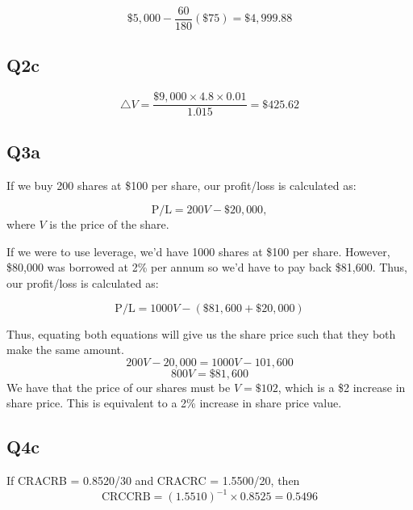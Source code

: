 \documentclass[a4paper]{article}[10pt]
\begin{document}
\begin{equation}
\$5,000 - \frac{60}{180}(\$75) = \$4,999.88	
\end{equation}

\subsection*{Q2c}
\begin{equation}
\triangle V = \frac{\$9,000 \times 4.8 \times 0.01}{1.015}	 = \$425.62
\end{equation}

\subsection*{Q3a}
If we buy 200 shares at \$100 per share, our profit/loss is calculated as:

\begin{equation}
\text{P/L} = 200V - \$20,000	,
\end{equation}
where $V$ is the price of the share.

If we were to use leverage, we'd have 1000 shares at \$100 per share. However, \$80,000 was borrowed at 2\% per annum so we'd have to pay back \$81,600.  Thus, our profit/loss is calculated as:

\begin{equation}
\text{P/L} = 1000V - (\$81,600 + \$20,000)	
\end{equation}

Thus, equating both equations will give us the share price such that they both make the same amount.
\begin{equation}
200V - 20,000 = 1000V - 101,600
\end{equation}
\begin{equation}
800V = \$81,600	
\end{equation}
We have that the price of our shares must be $V = \$102$, which is a \$2 increase in share price. This is equivalent to a 2\% increase in share price value.

\subsection*{Q4c}
If CRACRB = 0.8520/30 and CRACRC = 1.5500/20, then
\begin{equation}
\text{CRCCRB} = (1.5510)^{-1} \times 0.8525 = 0.5496	
\end{equation}
\end{document}

